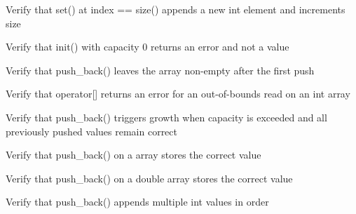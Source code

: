 \begin{DoxyRefList}
%
Verify that set() at index == size() appends a new int element and increments size  
\item[Global \doxylink{test__array_8cpp_a4aed371b48725da09c8d4f38da172042}{TEST\+\_\+F} (\doxylink{classArrayInitTest}{Array\+Init\+Test}, Init\+Zero\+Capacity\+Returns\+Error)]\label{test__test000010}%
%
Verify that init() with capacity 0 returns an error and not a value  
\item[Global \doxylink{test__array_8cpp_ab32bb4b8a9997eff5e4ff4f67d5f904a}{TEST\+\_\+F} (\doxylink{classArrayInitTest}{Array\+Init\+Test}, Push\+Back\+Array\+Is\+Not\+Empty\+After\+Push)]\label{test__test000019}%
%
Verify that push\+\_\+back() leaves the array non-\/empty after the first push  
\item[Global \doxylink{test__array_8cpp_a76ba18cd35da251bb9dd370842f2db25}{TEST\+\_\+F} (\doxylink{classArrayInitTest}{Array\+Init\+Test}, Push\+Back\+Out\+Of\+Bounds\+Read\+Returns\+Error)]\label{test__test000018}%
%
Verify that operator\mbox{[}\mbox{]} returns an error for an out-\/of-\/bounds read on an int array  
\item[Global \doxylink{test__array_8cpp_afd159604dd82af0bdd15458056bd176e}{TEST\+\_\+F} (\doxylink{classArrayInitTest}{Array\+Init\+Test}, Push\+Back\+Triggersgrowth)]\label{test__test000017}%
%
Verify that push\+\_\+back() triggers growth when capacity is exceeded and all previously pushed values remain correct  
\item[Global \doxylink{test__array_8cpp_a618e566aaa6b5405fc1ff40f47d00c18}{TEST\+\_\+F} (\doxylink{classArrayInitTest}{Array\+Init\+Test}, Push\+Back\+Point\+Element)]\label{test__test000016}%
%
Verify that push\+\_\+back() on a  array stores the correct value  
\item[Global \doxylink{test__array_8cpp_af477cfd33505a9554622da3f22b2a14f}{TEST\+\_\+F} (\doxylink{classArrayInitTest}{Array\+Init\+Test}, Push\+Back\+Double\+Element)]\label{test__test000015}%
%
Verify that push\+\_\+back() on a double array stores the correct value  
\item[Global \doxylink{test__array_8cpp_ac9f017c1ae5bca32cf231f9e2c98ef50}{TEST\+\_\+F} (\doxylink{classArrayInitTest}{Array\+Init\+Test}, Push\+Back\+Int\+Multiple\+Elements)]\label{test__test000014}%
%
Verify that push\+\_\+back() appends multiple int values in order  

\end{DoxyRefList}

